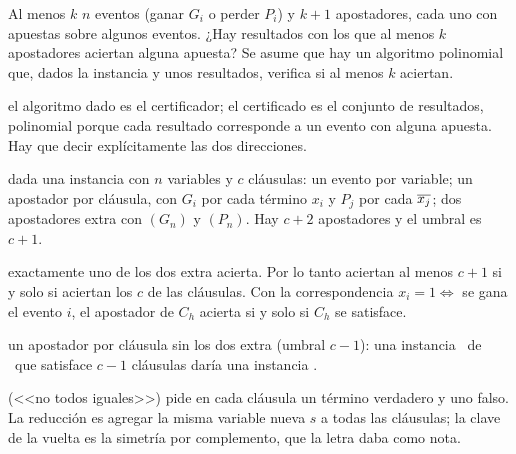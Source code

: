 \begin{problema}{Al menos $k$}
 $n$ eventos (ganar $G_i$ o perder $P_i$) y $k+1$ apostadores, cada uno con apuestas sobre algunos eventos. ¿Hay resultados con los que al menos $k$ apostadores aciertan alguna apuesta? Se asume que hay un algoritmo polinomial que, dados la instancia y unos resultados, verifica si al menos $k$ aciertan.

 el algoritmo dado es el certificador; el certificado es el conjunto de resultados, polinomial porque cada resultado corresponde a un evento con alguna apuesta. Hay que decir explícitamente las dos direcciones.

 dada una instancia con $n$ variables y $c$ cláusulas: un evento por variable; un apostador por cláusula, con $G_i$ por cada término $x_i$ y $P_j$ por cada $\overline{x_j}$; dos apostadores extra con $(G_n)$ y $(P_n)$. Hay $c+2$ apostadores y el umbral es $c+1$.

 exactamente uno de los dos extra acierta. Por lo tanto aciertan al menos $c+1$ si y solo si aciertan los $c$ de las cláusulas. Con la correspondencia $x_i=1\iff$ se gana el evento $i$, el apostador de $C_h$ acierta si y solo si $C_h$ se satisface.

 un apostador por cláusula sin los dos extra (umbral $c-1$): una instancia \npno\ de \npSAT\ que satisface $c-1$ cláusulas daría una instancia \npsi.
\end{problema}

 (<<no todos iguales>>) pide en cada cláusula un término verdadero y uno falso. La reducción es agregar la misma variable nueva $s$ a todas las cláusulas; la clave de la vuelta es la simetría por complemento, que la letra daba como nota.

